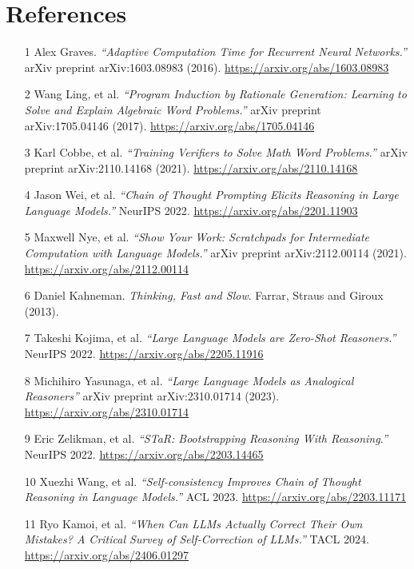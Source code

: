 \documentclass[12pt]{article}
\begin{document}
\newpage
\section{References}


\begin{itemize}
    \item [1] Alex Graves. \textit{``Adaptive Computation Time for Recurrent Neural Networks.''} arXiv preprint arXiv:1603.08983 (2016). \url{https://arxiv.org/abs/1603.08983}
    \item [2] Wang Ling, et al. \textit{``Program Induction by Rationale Generation: Learning to Solve and Explain Algebraic Word Problems.''} arXiv preprint arXiv:1705.04146 (2017). \url{https://arxiv.org/abs/1705.04146}
    \item [3] Karl Cobbe, et al. \textit{``Training Verifiers to Solve Math Word Problems.''} arXiv preprint arXiv:2110.14168 (2021). \url{https://arxiv.org/abs/2110.14168}
    \item [4] Jason Wei, et al. \textit{``Chain of Thought Prompting Elicits Reasoning in Large Language Models.''} NeurIPS 2022. \url{https://arxiv.org/abs/2201.11903}
    \item [5] Maxwell Nye, et al. \textit{``Show Your Work: Scratchpads for Intermediate Computation with Language Models.''} arXiv preprint arXiv:2112.00114 (2021). \url{https://arxiv.org/abs/2112.00114}
    \item [6] Daniel Kahneman. \textit{Thinking, Fast and Slow}. Farrar, Straus and Giroux (2013).
    \item [7] Takeshi Kojima, et al. \textit{``Large Language Models are Zero-Shot Reasoners.''} NeurIPS 2022. \url{https://arxiv.org/abs/2205.11916}
    \item [8] Michihiro Yasunaga, et al. \textit{``Large Language Models as Analogical Reasoners''} arXiv preprint arXiv:2310.01714 (2023). \url{https://arxiv.org/abs/2310.01714}
    \item [9] Eric Zelikman, et al. \textit{``STaR: Bootstrapping Reasoning With Reasoning.''} NeurIPS 2022. \url{https://arxiv.org/abs/2203.14465}
    \item [10] Xuezhi Wang, et al. \textit{``Self-consistency Improves Chain of Thought Reasoning in Language Models.''} ACL 2023. \url{https://arxiv.org/abs/2203.11171}
    \item [11] Ryo Kamoi, et al. \textit{``When Can LLMs Actually Correct Their Own Mistakes? A Critical Survey of Self-Correction of LLMs.''} TACL 2024. \url{https://arxiv.org/abs/2406.01297}

\end{itemize}
\end{document}
